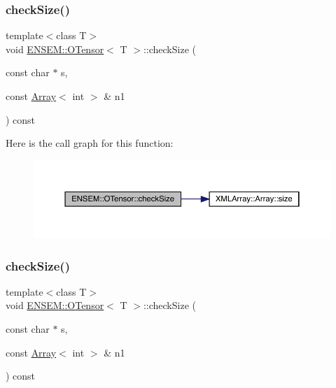 \mbox{\label{classENSEM_1_1OTensor_ac59e6465eb9803b05edcdec04f8d2370}} 
\subsubsection{\texorpdfstring{checkSize()}{checkSize()}\hspace{0.1cm}{\footnotesize\ttfamily [3/4]}}
{\footnotesize\ttfamily template$<$class T$>$ \\
void \mbox{\hyperlink{classENSEM_1_1OTensor}{E\+N\+S\+E\+M\+::\+O\+Tensor}}$<$ T $>$\+::check\+Size (\begin{DoxyParamCaption}\item[{const char $\ast$}]{s,  }\item[{const \mbox{\hyperlink{classXMLArray_1_1Array}{Array}}$<$ int $>$ \&}]{n1 }\end{DoxyParamCaption}) const\hspace{0.3cm}{\ttfamily [inline]}}

Here is the call graph for this function\+:
\nopagebreak
\begin{figure}[H]
\begin{center}
\leavevmode
\includegraphics[width=350pt]{da/d8a/classENSEM_1_1OTensor_ac59e6465eb9803b05edcdec04f8d2370_cgraph}
\end{center}
\end{figure}
\mbox{\label{classENSEM_1_1OTensor_ac59e6465eb9803b05edcdec04f8d2370}} 
\subsubsection{\texorpdfstring{checkSize()}{checkSize()}\hspace{0.1cm}{\footnotesize\ttfamily [4/4]}}
{\footnotesize\ttfamily template$<$class T$>$ \\
void \mbox{\hyperlink{classENSEM_1_1OTensor}{E\+N\+S\+E\+M\+::\+O\+Tensor}}$<$ T $>$\+::check\+Size (\begin{DoxyParamCaption}\item[{const char $\ast$}]{s,  }\item[{const \mbox{\hyperlink{classXMLArray_1_1Array}{Array}}$<$ int $>$ \&}]{n1 }\end{DoxyParamCaption}) const\hspace{0.3cm}{\ttfamily [inline]}}

